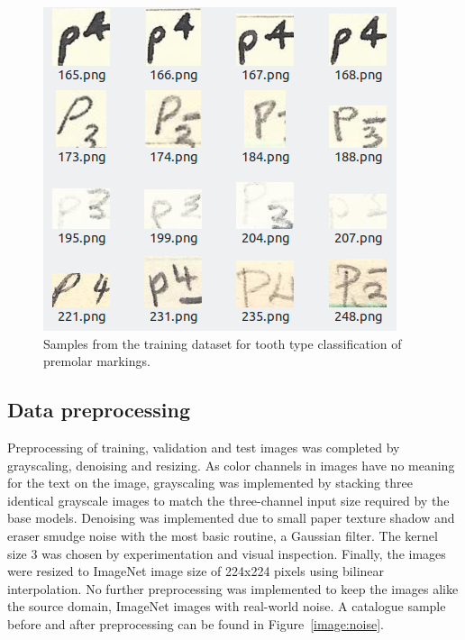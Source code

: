 \documentclass[english,twoside,openright]{UH_DS_MSc}
\begin{document}
\begin{figure}[h]
    \centering
    \includegraphics*[scale=.5]{images/trainingsamples.png}
    \caption{Samples from the training dataset for tooth type classification of premolar markings.}
    \label{image:samples}
\end{figure}

\subsection{Data preprocessing}
 
Preprocessing of training, validation and test images was completed by grayscaling, denoising and resizing.
As color channels in images have no meaning for the text on the image, grayscaling was implemented by
 stacking three identical grayscale images
to match the three-channel input size required by the base models.
Denoising was implemented due to
small paper texture shadow and eraser smudge noise with the most basic routine, a Gaussian filter.
The kernel size 3 was chosen by experimentation and visual inspection. Finally, the images were resized to 
ImageNet image size of 224x224 pixels using bilinear interpolation.
No further preprocessing was implemented to keep the images alike the source domain, ImageNet images with real-world noise.
 A catalogue sample before and after preprocessing can 
be found in Figure~\ref{image:noise}.
\end{document}
